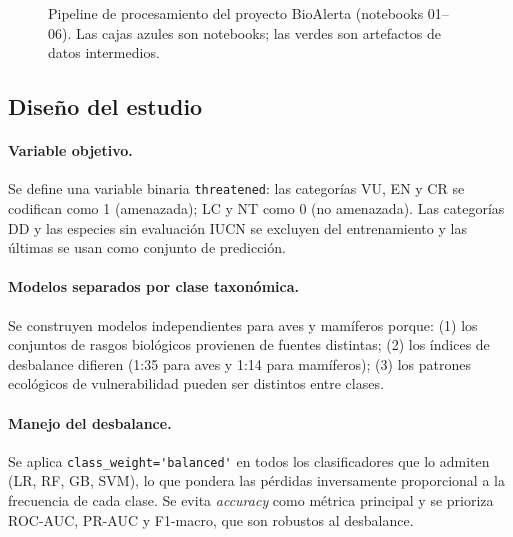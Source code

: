 \documentclass[12pt,a4paper]{article}
\begin{document}
\begin{figure}[H]
{%
}%
\caption{Pipeline de procesamiento del proyecto BioAlerta (notebooks 01--06).
         Las cajas azules son notebooks; las verdes son artefactos de datos intermedios.}
\label{fig:pipeline}
\end{figure}

\subsection{Diseño del estudio}

\paragraph{Variable objetivo.}
Se define una variable binaria \texttt{threatened}: las categorías VU, EN y CR se codifican
como 1 (amenazada); LC y NT como 0 (no amenazada).
Las categorías DD y las especies sin evaluación IUCN se excluyen del entrenamiento
y las últimas se usan como conjunto de predicción.

\paragraph{Modelos separados por clase taxonómica.}
Se construyen modelos independientes para aves y mamíferos porque: (1) los conjuntos de
rasgos biológicos provienen de fuentes distintas; (2) los índices de desbalance difieren
(1:35 para aves y 1:14 para mamíferos); (3) los patrones ecológicos de vulnerabilidad
pueden ser distintos entre clases.

\paragraph{Manejo del desbalance.}
Se aplica \verb|class_weight='balanced'| en todos los clasificadores que lo admiten
(LR, RF, GB, SVM), lo que pondera las pérdidas inversamente proporcional a la frecuencia
de cada clase.
Se evita \textit{accuracy} como métrica principal y se prioriza ROC-AUC, PR-AUC y
F1-macro, que son robustos al desbalance.
\end{document}
